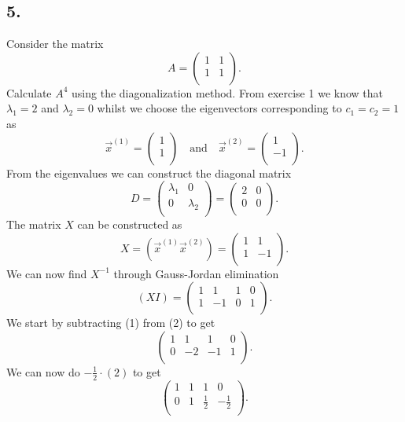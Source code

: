 \subsection*{5.} Consider the matrix
\[ 
A = \begin{pmatrix}
1 & 1\\
1 & 1\\
\end{pmatrix}
.\]
Calculate $A^{4}$ using the diagonalization method.
\bigbreak
From exercise 1 we know that $\lambda_1 = 2$ and $\lambda_2 = 0$ whilst we choose the eigenvectors corresponding to $c_1 = c_2 = 1$ as
\[ 
\Vec{x}^{(1)} = \begin{pmatrix}
1\\
1\\
\end{pmatrix} \quad \text{and} \quad \Vec{x}^{(2)} = \begin{pmatrix}
1\\
-1\\
\end{pmatrix}
.\]
From the eigenvalues we can construct the diagonal matrix
\[ 
D = \begin{pmatrix}
\lambda_1 & 0\\
0 & \lambda_2\\
\end{pmatrix} = \begin{pmatrix}
2 & 0\\
0 & 0\\
\end{pmatrix}
.\]
The matrix $X$ can be constructed as
\[ 
X = (\Vec{x}^{(1)} \Vec{x}^{(2)}) = \begin{pmatrix}
1 & 1\\
1 & -1\\
\end{pmatrix}
.\]
We can now find $X^{-1}$ through Gauss-Jordan elimination
\[ 
  (XI) = \left( \begin{array}{cc|cc}
  1 & 1 & 1 & 0\\
  1 & -1 & 0 & 1\\
  \end{array} \right)
.\]
We start by subtracting (1) from (2) to get
\[ 
\left( \begin{array}{cc|cc}
1 & 1 & 1 & 0 \\
0 & -2 & -1 & 1 \\
\end{array} \right)
.\]
We can now do $-\frac{1}{2} \cdot (2)$ to get
\[ 
\left( \begin{array}{cc|cc}
1 & 1 & 1 & 0\\
0 & 1 & \frac{1}{2} & -\frac{1}{2}  \\
\end{array} \right)
.\]

